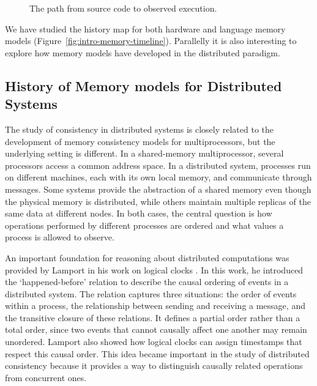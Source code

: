 \begin{figure}[ht]
\centering
{}
\caption{The path from source code to observed execution.}
\label{fig:intro-compilation-pipeline}
\end{figure}

We have studied the history map for both hardware and language memory models (Figure~\ref{fig:intro-memory-timeline}). Parallelly it is also interesting to explore how memory models have developed in the distributed paradigm. 

\subsection{History of Memory models for Distributed Systems}

The study of consistency in distributed systems is closely related to the development of memory consistency models for multiprocessors, but the underlying setting is different. In a shared-memory multiprocessor, several processors access a common address space. In a distributed system, processes run on different machines, each with its own local memory, and communicate through messages. Some systems provide the abstraction of a shared memory even though the physical memory is distributed, while others maintain multiple replicas of the same data at different nodes. In both cases, the central question is how operations performed by different processes are ordered and what values a process is allowed to observe.

An important foundation for reasoning about distributed computations was provided by Lamport in his work on logical clocks \cite{lamport78}. In this work, he introduced the `happened-before'  relation to describe the causal ordering of events in a distributed system. The relation captures three situations: the order of events within a process, the relationship between sending and receiving a message, and the transitive closure of these relations. It defines a partial order rather than a total order, since two events that cannot causally affect one another may remain unordered. Lamport also showed how logical clocks can assign timestamps that respect this causal order. This idea became important in the study of distributed consistency because it provides a way to distinguish causally related operations from concurrent ones.


